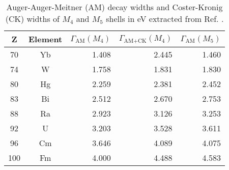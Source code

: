 \begin{table}[h]
 \caption{Auger-Auger-Meitner (AM) decay widths and Coster-Kronig (CK) widths
          of $M_4$ and $M_5$ shells
          in \unit{eV} extracted from
          Ref. \cite{Chen80}.}
 \begin{tabular}{ccrrr}
 \toprule
 Z & Element & $\Gamma_\text{AM}(M_4)$ & $\Gamma_\text{AM+CK}(M_4)$ & $\Gamma_\text{AM}(M_5)$\\
 \midrule
 70 & Yb & 1.408 & 2.445 & 1.460 \\
 74 & W  & 1.758 & 1.831 & 1.830 \\
 80 & Hg & 2.259 & 2.381 & 2.452 \\
 83 & Bi & 2.512 & 2.670 & 2.753 \\
 88 & Ra & 2.923 & 3.126 & 3.253 \\
 92 & U  & 3.203 & 3.528 & 3.611 \\
 96 & Cm & 3.646 & 4.089 & 4.075 \\
100 & Fm & 4.000 & 4.488 & 4.583 \\
 \bottomrule
 \end{tabular}
 \label{tab:M45}
\end{table}
